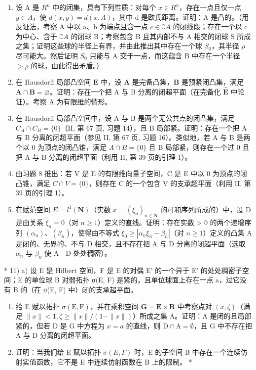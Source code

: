 \begin{enumerate}
\def\labelenumi{\arabic{enumi})}
\setcounter{enumi}{5}
\item
  设 A 是 \(R^{n}\) 中的闭集，具有下列性质：对每个 \(x \in R^{n}\)，存在一点且仅一点 \(y \in A\)，使 \(d(x, y) = d(x, A)\)，其中 d 是欧氏距离。证明：A 是凸的。（用反证法，考察 A 中以 a、b 为端点且含一点 \(c \in \complement A\) 的闭线段；存在一个以 c 为中心、含于 \(\complement A\) 的闭球 B；考察包含 B 且其内部不与 A 相交的闭球 S 所成之集；证明这些球的半径上有界，并由此推出其中存在一个球 \(S_{0}\)，其半径 \(\rho\) 尽可能大。然后证明 \(S_{0}\) 只能与 A 交于一点，而这蕴含 B 中存在一个半径 \(> \rho\) 的球，由此得出矛盾。）
\item
  在 Hausdorff 局部凸空间 \(\mathbf{E}\) 中，设 \(\mathbf{A}\) 是完备凸集，\(\mathbf{B}\) 是预紧闭凸集，满足 \(\mathbf{A} \cap \mathbf{B} = \varnothing\)。证明：存在一个把 A 与 B 分离的闭超平面（在完备化 \(\hat{\mathbf{E}}\) 中论证）。考察 A 为有限维的情形。
\item
  在 Hausdorff 局部凸空间中，设 A 与 B 是两个无公共点的闭凸集，满足 \(C_{A} \cap C_{B} = \{0\}\)（II, 第 67 页, 习题 14），且 B 局部紧。证明：存在一个把 A 与 B 分离的闭超平面（参见 II, 第 67 页, 习题 16）。类似地，若 A 与 B 是两个以 0 为顶点的闭凸锥，满足 \(A \cap B = \{0\}\) 且 B 局部紧，则存在一个过 0 且把 A 与 B 分离的闭超平面（利用 II, 第 39 页的引理 1）。
\item
  由习题 8 推出：若 V 是 E 的有限维向量子空间，C 是 E 中以 0 为顶点的闭凸锥，满足 \(C \cap V = \{0\}\)，则存在 C 的一个包含 V 的支承超平面（利用 II, 第 39 页的引理 1）。
\item
  在赋范空间 \(E = l^{1}(\mathbf{N})\)（实数 \(x = (\xi_{n})_{n \in \mathbf{N}}\) 的可和序列所成的）中，设 D 是由关系 \(\xi_{n} = 0\)（对 \(n \geqslant 1\)）定义的直线。证明：存在实数 > 0 的两个递增序列 \((\alpha_{n})\)、\((\beta_{n})\)，使得由不等式 \(\xi_{0} \geqslant |\alpha_{n}\xi_{n} - \beta_{n}|\)（对 \(n \geqslant 1\)）定义的凸集 A 是闭的、无界的、不与 D 相交，且不存在把 A 与 D 分离的闭超平面（选取 \(\alpha_{n}\) 与 \(\beta_{n}\) 使 A - D 处处稠密）。
\end{enumerate}

* 11) a) 设 E 是 Hilbert 空间，F 是 E 的对偶 E' 的一个异于 E' 的处处稠密子空间；E 的单位球 B 对弱拓扑 σ(E, F) 是紧的，且单位球面上存在一点 a，过它没有 B 的（在 σ(E, F) 中）闭的支承超平面。

\begin{enumerate}
\def\labelenumi{\alph{enumi})}
\setcounter{enumi}{1}
\item
  给 E 赋以拓扑 \(\sigma(\mathrm{E},\mathrm{F})\)，并在乘积空间 \(\mathbf{G} = \mathbf{E} \times \mathbf{R}\) 中考察点对 \((x,\zeta)\)（满足 \(\|x\| < 1, \zeta \geqslant \|x\| / (1 - \|x\|)\)）所成之集 A。证明：A 是闭的且局部紧的，但若 D 是 G 中方程为 \(x = a\) 的直线，则 \(\mathrm{D} \cap \mathrm{A} = \emptyset\)，且 G 中不存在把 A 与 D 分离的闭超平面。
\item
  证明：当我们给 E 赋以拓扑 \(\sigma(E, F)\) 时，E 的子空间 B 中存在一个连续仿射实值函数，它不是 E 中连续仿射函数在 B 上的限制。 *
\end{enumerate}

